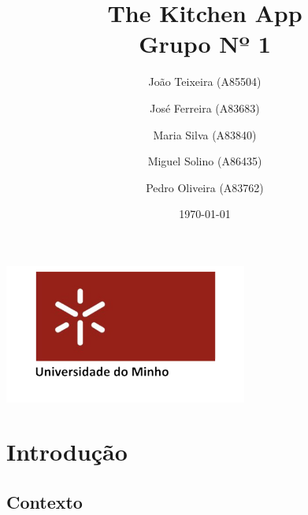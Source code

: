 \documentclass[a4paper]{report}
\begin{document}
\title{The Kitchen App\\
\large Grupo Nº 1}

\author{João Teixeira (A85504) \and José Ferreira (A83683) \and Maria Silva (A83840) \and Miguel Solino (A86435) \and Pedro Oliveira (A83762)}


\date{\today}

\begin{center}
    \begin{minipage}{0.75\linewidth}
        \centering
       
        \includegraphics[width=0.6\textwidth]{uminho.png}\par\vspace{1cm}
        \vspace{1cm}
        \href{https://www.uminho.pt/PT}
        {\color{black}{\scshape\LARGE Universidade do Minho}} \par
        \vspace{1cm}
        \href{https://www.di.uminho.pt/}
        {\color{black}{\scshape\Large Departamento de Informática}} \par
        \maketitle
    \end{minipage}
\end{center}

\tableofcontents

\pagebreak

	\chapter{Introdução}
	    
        \section{Contexto}
        
\end{document}
